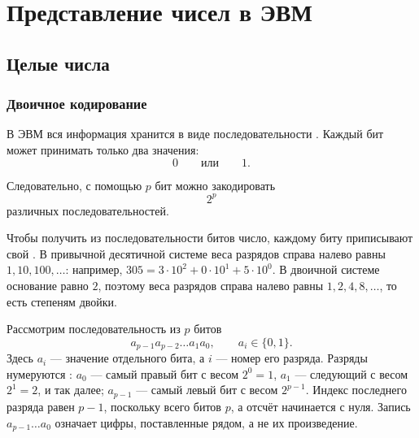 \documentclass[../final.tex]{subfiles}
\begin{document}
\ifSubfilesClassLoaded{\setcounter{chapter}{0}\setcounter{section}{4}}{}



\chapter{Представление чисел в ЭВМ}



\section{Целые числа}

\subsection{Двоичное кодирование}

В ЭВМ вся информация хранится в виде последовательности
. Каждый бит может принимать только два значения:
%
\[
    0
    \qquad \text{или} \qquad
    1.
\]

Следовательно, с помощью $p$ бит можно закодировать
%
\[
    2^p
\]
%
различных последовательностей.

Чтобы получить из последовательности битов число, каждому биту
приписывают свой . В привычной десятичной
системе веса разрядов справа налево равны $1,10,100,\ldots$:
например, $305=3\cdot10^2+0\cdot10^1+5\cdot10^0$.
В двоичной системе основание равно $2$, поэтому веса разрядов
справа налево равны $1,2,4,8,\ldots$, то есть степеням двойки.

Рассмотрим последовательность из $p$ битов
%
\[
    a_{p-1}a_{p-2}\ldots a_1a_0,
    \qquad
    a_i\in\{0,1\}.
\]
%
Здесь $a_i$ --- значение отдельного бита, а $i$ --- номер его
разряда. Разряды нумеруются :
$a_0$ --- самый правый бит с весом $2^0=1$,
$a_1$ --- следующий с весом $2^1=2$, и так далее;
$a_{p-1}$ --- самый левый бит с весом $2^{p-1}$.
Индекс последнего разряда равен $p-1$, поскольку всего битов $p$,
а отсчёт начинается с нуля. Запись $a_{p-1}\ldots a_0$ означает
цифры, поставленные рядом, а не их произведение.
\end{document}
